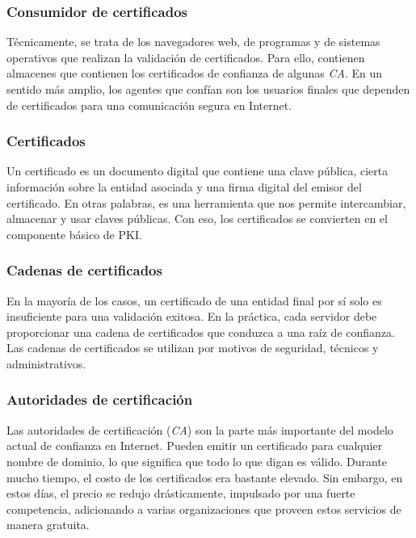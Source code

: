 \subsubsection*{Consumidor de certificados}

Técnicamente, se trata de los navegadores web, de programas y de sistemas 
operativos que realizan la validación de certificados. Para ello, contienen 
almacenes que contienen los certificados de confianza de algunas \emph{CA}. En un 
sentido más amplio, los agentes que confían son los usuarios finales que 
dependen de certificados para una comunicación segura en Internet.

\subsubsection*{Certificados}

Un certificado es un documento digital que contiene una clave pública, cierta 
información sobre la entidad asociada y una firma digital del emisor del 
certificado. En otras palabras, es una herramienta que nos permite intercambiar, 
almacenar y usar claves públicas. Con eso, los certificados se convierten en 
el componente básico de PKI.

\subsubsection*{Cadenas de certificados}

En la mayoría de los casos, un certificado de una entidad final por sí solo es 
insuficiente para una validación exitosa. En la práctica, cada servidor debe 
proporcionar una cadena de certificados que conduzca a una raíz de confianza. 
Las cadenas de certificados se utilizan por motivos de seguridad, técnicos y 
administrativos.

\subsubsection*{Autoridades de certificación}

Las autoridades de certificación (\emph{CA}) son la parte más importante del modelo 
actual de confianza en Internet. Pueden emitir un certificado para cualquier 
nombre de dominio, lo que significa que todo lo que digan es válido. 
Durante mucho tiempo, el costo de los certificados era bastante elevado. 
Sin embargo, en estos días, el precio se redujo drásticamente, impulsado 
por una fuerte competencia, adicionando a varias organizaciones que proveen 
estos servicios de manera gratuita. 

